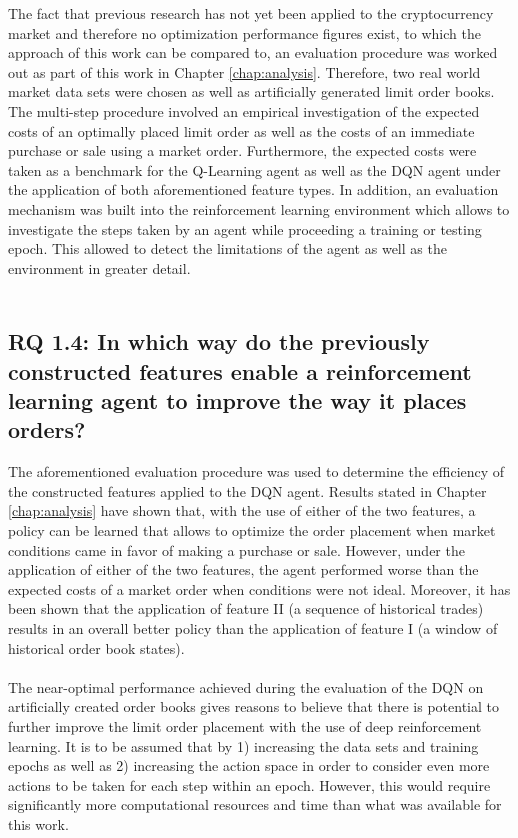     The fact that previous research has not yet been applied to the cryptocurrency market and therefore no optimization performance figures exist, to which the approach of this work can be compared to, an evaluation procedure was worked out as part of this work in Chapter \ref{chap:analysis}.
    Therefore, two real world market data sets were chosen as well as artificially generated limit order books.
    The multi-step procedure involved an empirical investigation of the expected costs of an optimally placed limit order as well as the costs of an immediate purchase or sale using a market order.
    Furthermore, the expected costs were taken as a benchmark for the Q-Learning agent as well as the DQN agent under the application of both aforementioned feature types.
    In addition, an evaluation mechanism was built into the reinforcement learning environment which allows to investigate the steps taken by an agent while proceeding a training or testing epoch.
    This allowed to detect the limitations of the agent as well as the environment in greater detail.
    \\
    \\
    
    
    
\subsection{RQ 1.4: In which way do the previously constructed features enable a reinforcement learning agent to improve the way it places orders?}

    The aforementioned evaluation procedure was used to determine the efficiency of the constructed features applied to the DQN agent.
    Results stated in Chapter \ref{chap:analysis} have shown that, with the use of either of the two features, a policy can be learned that allows to optimize the order placement when market conditions came in favor of making a purchase or sale.
    However, under the application of either of the two features, the agent performed worse than the expected costs of a market order when conditions were not ideal.
    Moreover, it has been shown that the application of feature II (a sequence of historical trades) results in an overall better policy than the application of feature I (a window of historical order book states).
    \\
    \\
The near-optimal performance achieved during the evaluation of the DQN on artificially created order books gives reasons to believe that there is potential to further improve the limit order placement with the use of deep reinforcement learning.
It is to be assumed that by 1) increasing the data sets and training epochs as well as 2) increasing the action space in order to consider even more actions to be taken for each step within an epoch.
However, this would require significantly more computational resources and time than what was available for this work.

